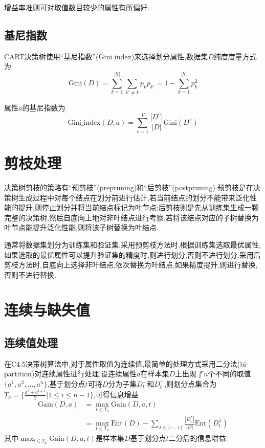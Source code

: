 增益率准则可对取值数目较少的属性有所偏好.

\subsection{基尼指数}

CART决策树使用``基尼指数''(Gini index)来选择划分属性,数据集$D$纯度度量方式为
\begin{equation}
\text{Gini}(D)=\sum_{k=1}^{|\mathcal Y|}\sum_{k'\ne k}p_kp_{k'}=1-\sum_{k=1}^{|\mathcal Y|}p_k^2
\end{equation}

属性$a$的基尼指数为
\begin{equation}
\text{Gini\_index}(D,a)=\sum_{v=1}^V\frac{|D^v|}{|D|}\text{Gini}(D^v)
\end{equation}

\section{剪枝处理}

决策树剪枝的策略有``预剪枝''(prepruning)和``后剪枝''(postpruning).预剪枝是在决策树生成过程中对每个结点在划分前进行估计,若当前结点的划分不能带来泛化性能的提升,则停止划分并将当前结点标记为叶节点;后剪枝则是先从训练集生成一颗完整的决策树,然后自底向上地对非叶结点进行考察,若将该结点对应的子树替换为叶节点能提升泛化性能,则将该子树替换为叶结点.

通常将数据集划分为训练集和验证集.采用预剪枝方法时,根据训练集选取最优属性,如果选取的最优属性可以提升验证集的精度时,则进行划分,否则不进行划分.采用后剪枝方法时,自底向上选择非叶结点,依次替换为叶结点,如果精度提升,则进行替换,否则不进行替换.

\section{连续与缺失值}

\subsection{连续值处理}

在C4.5决策树算法中,对于属性取值为连续值,最简单的处理方式采用二分法(bi-partition)对连续属性进行处理.设连续属性$a$在样本集$D$上出现了$n$个不同的取值$\{a^1,a^2,\dots,a^n\}$,基于划分点$t$可将$D$分为子集$D_t^-$和$D_t^+$,则划分点集合为$T_a=\{\frac{a^i+a^{i+1}}{2}|1\le i\le n-1\}$,可得信息增益
\begin{equation}\begin{split}
\text{Gain}(D,a)&=\max_{t\in T_a}\text{Gain}(D,a,t)\\
&=\max_{t\in T_a}\text{Ent}(D)-\sum_{\lambda\in\{-,+\}}\frac{|D_t^\lambda|}{|D|}\text{Ent}(D_t^\lambda)
\end{split}\end{equation}
其中$\max_{t\in T_a}\text{Gain}(D,a,t)$是样本集$D$基于划分点$t$二分后的信息增益.

